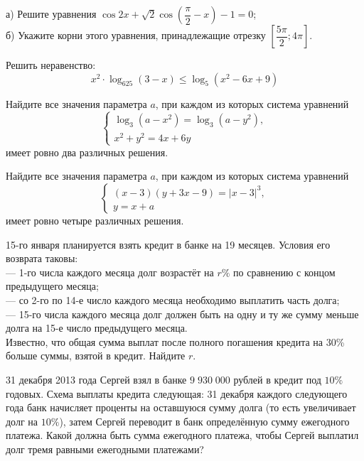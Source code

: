 \begin{class}[number=6]
	\begin{listofex}
		\item
		а) Решите уравнения \( \cos2x+\sqrt{2}\cos\left( \dfrac{\pi}{2}-x \right)-1=0 \);\\
		б) Укажите корни этого уравнения, принадлежащие отрезку \( \left[ \dfrac{5\pi}{2};4\pi \right] \).
		\item Решить неравенство:
		\[ x^2\cdot\log_{625}(3-x)\le\log_5(x^2-6x+9) \]
		\item Найдите все значения параметра \( a \), при каждом из которых система уравнений
		\[ \left\{
		\begin{array}{l}
			\log_3(a-x^2)=\log_3(a-y^2),\\
			x^2+y^2=4x+6y
		\end{array}
		\right. \]
		имеет ровно два различных решения.
		\item Найдите все значения параметра \( a \), при каждом из которых система уравнений
		\[ \left\{
		\begin{array}{l}
			(x-3)(y+3x-9)=|x-3|^3,\\
			y=x+a
		\end{array}
		\right. \]
		имеет ровно четыре различных решения.
		\item 15-го января планируется взять кредит в банке на 19 месяцев. Условия его возврата таковы:\\
		--- 1-го числа каждого месяца долг возрастёт на \( r\% \) по сравнению с концом предыдущего месяца;\\
		--- со 2-го по 14-е число каждого месяца необходимо выплатить часть долга;\\
		--- 15-го числа каждого месяца долг должен быть на одну и ту же сумму меньше долга на 15-е число предыдущего месяца.\\
		Известно, что общая сумма выплат после полного погашения кредита на 30\% больше суммы, взятой в кредит. Найдите \( r \).
		\item 31 декабря 2013 года Сергей взял в банке \( 9\;930\;000 \) рублей в кредит под \( 10\% \) годовых. Схема выплаты кредита следующая: 31 декабря каждого следующего года банк начисляет проценты на оставшуюся сумму долга (то есть увеличивает долг на \( 10\% \)), затем Сергей переводит в банк определённую сумму ежегодного платежа. Какой должна быть сумма ежегодного платежа, чтобы Сергей выплатил долг тремя равными ежегодными платежами?
	\end{listofex}
\end{class}

